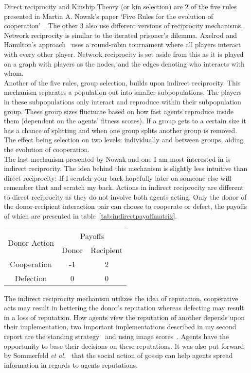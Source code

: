\documentclass[]{final_report}
\begin{document}
Direct reciprocity and Kinship Theory (or kin selection) are 2 of the five rules presented in Martin A. Nowak's paper `Five Rules for the evolution of cooperation'~\cite{five_rules_coop}. The other 3 also use different versions of reciprocity mechanisms. Network reciprocity is similar to the iterated prisoner's dilemma. Axelrod and Hamilton's approach~\cite{evolution_of_cooperation} uses a round-robin tournament where all players interact with every other player. Network reciprocity is set aside from this as it is played on a graph with players as the nodes, and the edges denoting who interacts with whom.\\
Another of the five rules, group selection, builds upon indirect reciprocity. This mechanism separates a population out into smaller subpopulations. The players in these subpopulations only interact and reproduce within their subpopulation group. These group sizes fluctuate based on how fast agents reproduce inside them (dependent on the agents' fitness scores). If a group gets to a certain size it has a chance of splitting and when one group splits another group is removed. The effect being selection on two levels: individually and between groups, aiding the evolution of cooperation.\\
The last mechanism presented by Nowak and one I am most interested in is indirect reciprocity. The idea behind this mechanism is slightly less intuitive than direct reciprocity: If I scratch your back hopefully later on someone else will remember that and scratch my back. Actions in indirect reciprocity are different to direct reciprocity as they do not involve both agents acting. Only the donor of the donor-recipient interaction pair can choose to cooperate or defect, the payoffs of which are presented in table~\ref{tab:indirectpayoffmatrix}.
\begin{framed}
	\begin{center}
		\begin{tabular}{c|c|c}
		\multirow{2}{*}{Donor Action} & \multicolumn{2}{c}{Payoffs}\\		
		& Donor & Recipient\\
		\hline
		Cooperation & -1 & 2\\
		\hline
		Defection & 0 & 0\\
		\end{tabular}
		\label{tab:indirectpayoffmatrix}
	\end{center}	
\end{framed}
The indirect reciprocity mechanism utilizes the idea of reputation, cooperative acts may result in bettering the donor's reputation whereas defecting may result in a loss of reputation. How agents view the reputation of another depends upon their implementation, two important implementations described in my second report are the standing strategy~\cite{leimarhammer} and using image scores~\cite{evol_indirect_image}. Agents have the opportunity to base their decisions on these reputations. It was also put forward by Sommerfeld \textit{et al.}~\cite{gossip_alt} that the social action of gossip can help agents spread information in regards to agents reputations.
\end{document}
